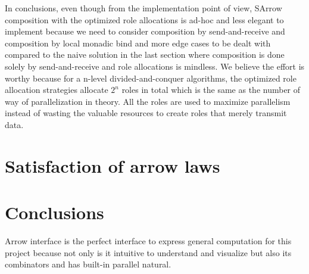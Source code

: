 In conclusions, even though from the implementation point of view, SArrow composition with the optimized role allocations is ad-hoc and less elegant to implement because we need to consider composition by send-and-receive and composition by local monadic bind and more edge cases to be dealt with compared to the naive solution in the last section where composition is done solely by send-and-receive and role allocations is mindless. We believe the effort is worthy because for a n-level divided-and-conquer algorithms, the optimized role allocation strategies allocate $2^n$ roles in total which is the same as the number of way of parallelization in theory. All the roles are used to maximize parallelism instead of wasting the valuable resources to create roles that merely transmit data.
\section{Satisfaction of arrow laws}
% 

\section{Conclusions}
Arrow interface is the perfect interface to express general computation for this project because not only is it intuitive to understand and visualize but also its combinators \hask{***} and \hask{&&&} has built-in parallel natural.

